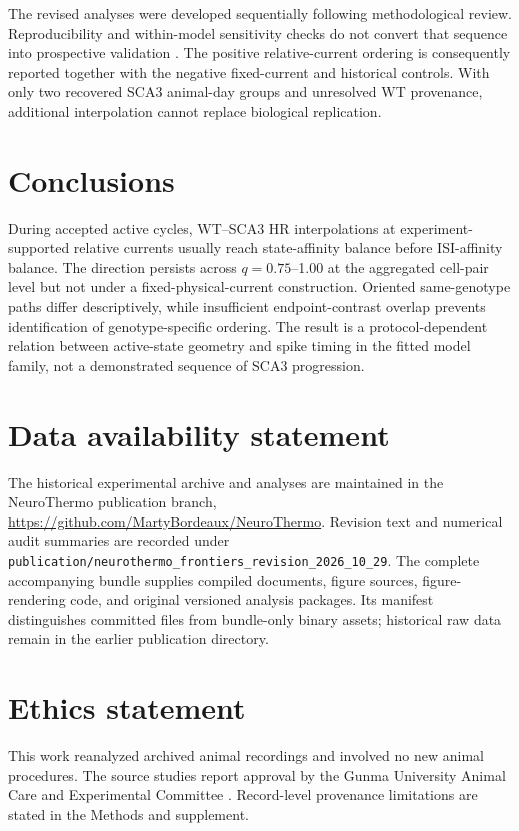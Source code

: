 \documentclass[utf8]{FrontiersinHarvard}
\begin{document}
The revised analyses were developed sequentially following methodological review. Reproducibility and within-model sensitivity checks do not convert that sequence into prospective validation \citep{steegen2016}. The positive relative-current ordering is consequently reported together with the negative fixed-current and historical controls. With only two recovered SCA3 animal-day groups and unresolved WT provenance, additional interpolation cannot replace biological replication.

\section{Conclusions}\label{sec:conclusion}
During accepted active cycles, WT--SCA3 HR interpolations at experiment-supported relative currents usually reach state-affinity balance before ISI-affinity balance. The direction persists across $q=0.75$--1.00 at the aggregated cell-pair level but not under a fixed-physical-current construction. Oriented same-genotype paths differ descriptively, while insufficient endpoint-contrast overlap prevents identification of genotype-specific ordering. The result is a protocol-dependent relation between active-state geometry and spike timing in the fitted model family, not a demonstrated sequence of SCA3 progression.

\section*{Data availability statement}
The historical experimental archive and analyses are maintained in the NeuroThermo publication branch, \url{https://github.com/MartyBordeaux/NeuroThermo}. Revision text and numerical audit summaries are recorded under \nolinkurl{publication/neurothermo_frontiers_revision_2026_10_29}. The complete accompanying bundle supplies compiled documents, figure sources, figure-rendering code, and original versioned analysis packages. Its manifest distinguishes committed files from bundle-only binary assets; historical raw data remain in the earlier publication directory.
\section*{Ethics statement}
This work reanalyzed archived animal recordings and involved no new animal procedures. The source studies report approval by the Gunma University Animal Care and Experimental Committee \citep{oue2009,konno2014}. Record-level provenance limitations are stated in the Methods and supplement.
\end{document}
